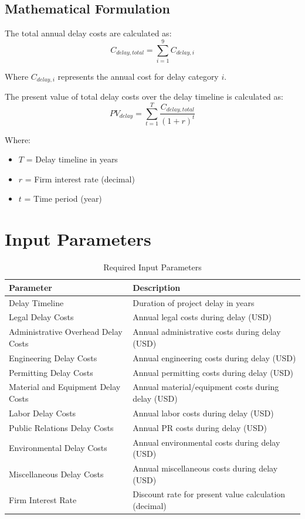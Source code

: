\documentclass[12pt]{article}
\begin{document}
\subsection{Mathematical Formulation}

The total annual delay costs are calculated as:
\begin{equation}
C_{delay,total} = \sum_{i=1}^{9} C_{delay,i}
\end{equation}

Where $C_{delay,i}$ represents the annual cost for delay category $i$.

The present value of total delay costs over the delay timeline is calculated as:
\begin{equation}
PV_{delay} = \sum_{t=1}^{T} \frac{C_{delay,total}}{(1 + r)^t}
\end{equation}

Where:
\begin{itemize}
    \item $T$ = Delay timeline in years
    \item $r$ = Firm interest rate (decimal)
    \item $t$ = Time period (year)
\end{itemize}

\section{Input Parameters}

\begin{table}[H]
\centering
\caption{Required Input Parameters}
\begin{tabular}{@{}ll@{}}
\toprule
\textbf{Parameter} & \textbf{Description} \\
\midrule
Delay Timeline & Duration of project delay in years \\
Legal Delay Costs & Annual legal costs during delay (USD) \\
Administrative Overhead Delay Costs & Annual administrative costs during delay (USD) \\
Engineering Delay Costs & Annual engineering costs during delay (USD) \\
Permitting Delay Costs & Annual permitting costs during delay (USD) \\
Material and Equipment Delay Costs & Annual material/equipment costs during delay (USD) \\
Labor Delay Costs & Annual labor costs during delay (USD) \\
Public Relations Delay Costs & Annual PR costs during delay (USD) \\
Environmental Delay Costs & Annual environmental costs during delay (USD) \\
Miscellaneous Delay Costs & Annual miscellaneous costs during delay (USD) \\
Firm Interest Rate & Discount rate for present value calculation (decimal) \\
\bottomrule
\end{tabular}
\end{table}
\end{document}
